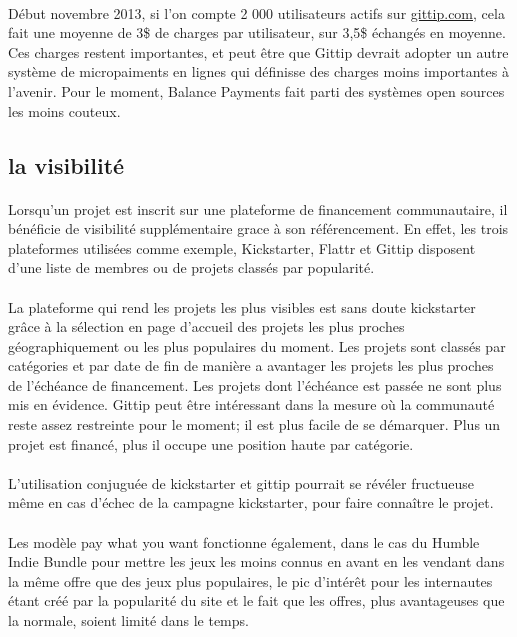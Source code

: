 \paragraph{}
Début novembre 2013, si l'on compte 2 000 utilisateurs actifs sur
\url{gittip.com}, cela fait une moyenne de 3\${} de charges par utilisateur,
sur 3,5\${} échangés en moyenne. Ces charges restent importantes, et peut être
que Gittip devrait adopter un autre système de micropaiments en lignes qui
définisse des charges moins importantes à l'avenir. Pour le moment, Balance
Payments fait parti des systèmes open sources les moins couteux.

\subsection{la visibilité}

\paragraph{}
Lorsqu'un projet est inscrit sur une plateforme de financement communautaire,
il bénéficie de visibilité supplémentaire grace à son référencement. En effet,
les trois plateformes utilisées comme exemple, Kickstarter, Flattr et Gittip
disposent d'une liste de membres ou de projets classés par popularité.

\paragraph{}
La plateforme qui rend les projets les plus visibles est sans doute kickstarter
grâce à la sélection en page d'accueil des projets les plus proches
géographiquement ou les plus populaires du moment. Les projets sont classés par
catégories et par date de fin de manière a avantager les projets les plus
proches de l'échéance de financement. Les projets dont l'échéance est passée ne
sont plus mis en évidence.
Gittip peut être intéressant dans la mesure où la communauté reste assez
restreinte pour le moment; il est plus facile de se démarquer. Plus un projet
est financé, plus il occupe une position haute par catégorie.

\paragraph{}
L'utilisation conjuguée de kickstarter et gittip pourrait se révéler fructueuse
même en cas d'échec de la campagne kickstarter, pour faire connaître le projet.

\paragraph{}
Les modèle pay what you want fonctionne également, dans le cas du Humble Indie
Bundle pour mettre les jeux les moins connus en avant en les vendant dans la
même offre que des jeux plus populaires, le pic d'intérêt pour les internautes
étant créé par la popularité du site et le fait que les offres, plus
avantageuses que la normale, soient limité dans le temps.
